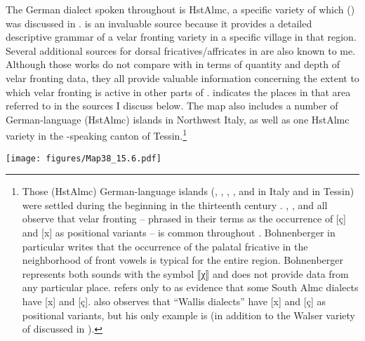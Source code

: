 {The German dialect spoken throughout  is HstAlmc, a specific variety of which () was discussed in . \citet{Wipf1910} is an invaluable source because it provides a detailed descriptive grammar of a velar fronting variety in a specific village in that region. Several additional sources for dorsal fricatives/affricates in  are also known to me. Although those works do not compare with \citet{Wipf1910} in terms of quantity and depth of velar fronting data, they all provide valuable information concerning the extent to which velar fronting is active in other parts of .  indicates the places in that area referred to in the sources I discuss below. The map also includes a number of German-language (HstAlmc) islands  in Northwest Italy, as well as one HstAlmc variety in the -speaking canton of Tessin.\footnote{{Those (HstAlmc) German-language islands (, , , , and  in Italy and  in Tessin) were settled during the  beginning in the thirteenth century \citep[903]{Wiesinger1983b}.} \textrm{\citet{Bohnenberger1913}, \citet{Jutz1931}, and \citet{Moulton1941} all observe that velar fronting -- phrased in their terms as the occurrence of [ç] and [x] as positional variants -- is common throughout . Bohnenberger in particular writes that the occurrence of the palatal fricative in the neighborhood of front vowels is typical for the entire region. Bohnenberger represents both sounds with the symbol ⟦χ⟧ and does not provide data from any particular place. \citet[208]{Jutz1931} refers only to  as evidence that some South Almc dialects have [x] and [ç]. \citet[40]{Moulton1941} also observes that “Wallis dialects” have [x] and [ç] as positional variants, but his only example is  (in addition to the Walser variety of  discussed in ).}}

\begin{map}
\texttt{[image: figures/Map38\_15.6.pdf]}
\caption[{Upper Valais}, Northwest Italy, and Tessin]{{Upper Valais}, Northwest Italy, and Tessin. Squares indicate some version of velar fronting (postsonorant and/or word-initial), and the circle represents the absence of velar fronting. 1=\citet{Wipf1910}, 2=\citet{Henzen1928, Henzen1932}, 3=\citet{Rübel1950}, 4=\citet{Schmid1969}, 5=\citet{Werlen1987}, 6=\citet{Russ2002}, 7=SDS.}\label{map:38}
\end{map}

}
